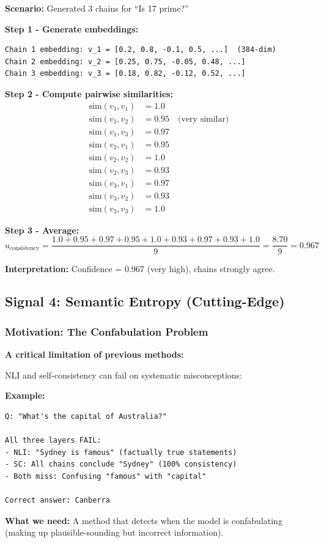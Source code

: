 \documentclass[12pt,a4paper]{article}
\theoremstyle{definition}
\begin{document}
\begin{examplebox}
\textbf{Scenario:} Generated 3 chains for ``Is 17 prime?''

\textbf{Step 1 - Generate embeddings:}
\begin{verbatim}
Chain 1 embedding: v_1 = [0.2, 0.8, -0.1, 0.5, ...]  (384-dim)
Chain 2 embedding: v_2 = [0.25, 0.75, -0.05, 0.48, ...]
Chain 3 embedding: v_3 = [0.18, 0.82, -0.12, 0.52, ...]
\end{verbatim}

\textbf{Step 2 - Compute pairwise similarities:}
\begin{align}
\text{sim}(v_1, v_1) &= 1.0 \\
\text{sim}(v_1, v_2) &= 0.95 \quad \text{(very similar)} \\
\text{sim}(v_1, v_3) &= 0.97 \\
\text{sim}(v_2, v_1) &= 0.95 \\
\text{sim}(v_2, v_2) &= 1.0 \\
\text{sim}(v_2, v_3) &= 0.93 \\
\text{sim}(v_3, v_1) &= 0.97 \\
\text{sim}(v_3, v_2) &= 0.93 \\
\text{sim}(v_3, v_3) &= 1.0
\end{align}

\textbf{Step 3 - Average:}
\begin{equation}
u_{\text{consistency}} = \frac{1.0 + 0.95 + 0.97 + 0.95 + 1.0 + 0.93 + 0.97 + 0.93 + 1.0}{9} = \frac{8.70}{9} = 0.967
\end{equation}

\textbf{Interpretation:} Confidence = 0.967 (very high), chains strongly agree.
\end{examplebox}

\subsection{Signal 4: Semantic Entropy (Cutting-Edge)}

\subsubsection{Motivation: The Confabulation Problem}

\begin{problembox}
\textbf{A critical limitation of previous methods:}

NLI and self-consistency can fail on systematic misconceptions:

\textbf{Example:}
\begin{verbatim}
Q: "What's the capital of Australia?"

All three layers FAIL:
- NLI: "Sydney is famous" (factually true statements)
- SC: All chains conclude "Sydney" (100% consistency)
- Both miss: Confusing "famous" with "capital"

Correct answer: Canberra
\end{verbatim}

\textbf{What we need:} A method that detects when the model is confabulating (making up plausible-sounding but incorrect information).
\end{problembox}
\end{document}

